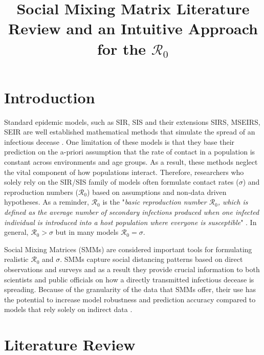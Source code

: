 \documentclass[12pt]{article}
\title{Social Mixing Matrix Literature Review and an Intuitive Approach for the $\mathcal{R}_{0}$}
\begin{document}
\maketitle

\section{Introduction}

Standard epidemic models, such as SIR, SIS and their extensions  SIRS, MSEIRS, SEIR are well established mathematical methods that simulate the spread of an infectious decease \cite{keeling2008modeling, ma2009mathematical, li2018introduction}. One limitation of these models is that they base their prediction on the a-priori assumption that the rate of contact in a population is constant across environments and age groups. As a result, these methods neglect the vital component of how populations interact. Therefore, researchers who solely rely on the SIR/SIS family of models often formulate contact rates ($\sigma$) and reproduction numbers ($\mathcal{R}_{0} $) based on assumptions and non-data driven hypotheses. As a reminder, $\mathcal{R}_{0} $ is the "\textit{basic reproduction number $\mathcal{R}_{0}$, which is defined as the average number of secondary infections produced when one infected individual is introduced into a host population where everyone is susceptible}" \cite[p.21]{ma2009mathematical}. In general, $\mathcal{R}_{0} >\sigma$ but in many models $\mathcal{R}_{0} =\sigma$. 

Social Mixing Matrices (SMMs) are considered important tools for formulating realistic $\mathcal{R_{0}}$ and $\sigma$. SMMs capture social distancing patterns based on direct observations and surveys and as a result they provide crucial information to both scientists and public officials on how a directly transmitted infectious decease is spreading. Because of the granularity of the data that SMMs offer, their use has the potential to increase model robustness and prediction accuracy compared to models that rely solely on indirect data \cite{Mossong:2008, Baguelin:2013}. 

\section{Literature Review}
\end{document}
